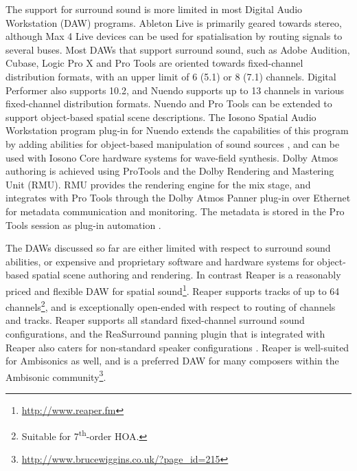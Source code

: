 \documentclass{article}
\begin{document}
The support for surround sound is more limited in most Digital Audio Workstation (DAW) programs.
Ableton Live is primarily geared towards stereo, although Max 4 Live devices can be used for spatialisation by routing signals to several buses.
Most DAWs that support surround sound, such as Adobe Audition, Cubase, Logic Pro X and Pro Tools are oriented towards fixed-channel distribution formats, with an upper limit of 6 (5.1) or 8 (7.1) channels.
Digital Performer also supports 10.2, and Nuendo supports up to 13 channels in various fixed-channel distribution formats.
Nuendo and Pro Tools can be extended to support object-based spatial scene descriptions.
The Iosono Spatial Audio Workstation program plug-in for Nuendo extends the capabilities of this program by adding abilities for object-based manipulation of sound sources \cite{iosono2012:workstation}, and can be used with Iosono Core hardware systems for wave-field synthesis.
Dolby Atmos authoring is achieved using ProTools and the Dolby Rendering and Mastering Unit (RMU).
RMU provides the rendering engine for the mix stage, and integrates with Pro Tools through the Dolby Atmos Panner plug-in over Ethernet for metadata communication and monitoring. 
The metadata is stored in the Pro Tools session as plug-in automation \cite{dolby:2013authoring}.

The DAWs discussed so far are either limited with respect to surround sound abilities, or expensive and proprietary software and hardware systems for object-based spatial scene authoring and rendering.
In contrast Reaper is a reasonably priced and flexible DAW for spatial sound\footnote{\href{http://www.reaper.fm}{http://www.reaper.fm}}.
Reaper supports tracks of up to 64 channels\footnote{Suitable for 7\textsuperscript{th}-order HOA.}, and is exceptionally open-ended with respect to routing of channels and tracks.
Reaper supports all standard fixed-channel surround sound configurations, and the ReaSurround panning plugin that is integrated with Reaper also caters for non-standard speaker configurations \cite{francis:2014_reaper}.
Reaper is well-suited for Ambisonics as well, and is a preferred DAW for many composers within the Ambisonic  community\footnote{\href{http://www.brucewiggins.co.uk/?page\_id=215}{http://www.brucewiggins.co.uk/?page\_id=215}}.
\end{document}
